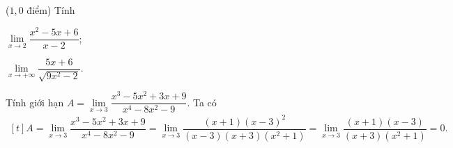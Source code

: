 \begin{bt}%
 ($1{,}0$ điểm) Tính 
\begin{listEX}[2] 
\item $\lim\limits_{x \rightarrow 2} \dfrac{x^2-5 x+6}{x-2}$;
\item $\lim\limits_{x \rightarrow+\infty} \dfrac{5x+6}{\sqrt{9x^2-2}}$. 
 \end{listEX}
\end{bt}

\begin{bt}%
	Tính giới hạn $A=\lim\limits_{x\to 3}\dfrac{x^3-5x^2+3x+9}{x^4-8x^2-9}$. 
	\loigiai
	{
		\allowdisplaybreaks
		Ta có $\begin{aligned}[t]
			A=\lim\limits_{x\to 3}\dfrac{x^3-5x^2+3x+9}{x^4-8x^2-9}
			=\lim\limits_{x\to 3}\dfrac{\left(x+1\right)\left(x-3\right)^2}{\left(x-3\right)\left(x+3\right)\left(x^2+1 \right)}
			=\lim\limits_{x\to 3}\dfrac{\left(x+1\right)\left(x-3\right)}{(x+3)(x^2+1)}
			= 0.
		\end{aligned}$
	}
\end{bt}

